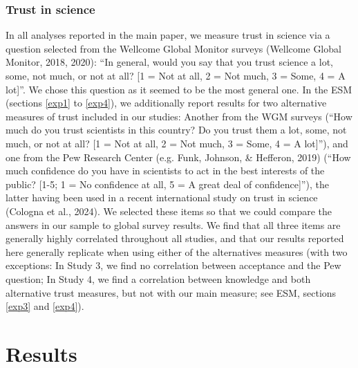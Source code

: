 \documentclass[
  doc,floatsintext]{apa6}
\begin{document}
\subsubsection{Trust in science}\label{trust-in-science}

In all analyses reported in the main paper, we measure trust in science via a question selected from the Wellcome Global Monitor surveys (Wellcome Global Monitor, 2018, 2020): ``In general, would you say that you trust science a lot, some, not much, or not at all? {[}1 = Not at all, 2 = Not much, 3 = Some, 4 = A lot{]}''. We chose this question as it seemed to be the most general one. In the ESM (sections \ref{exp1} to \ref{exp4}), we additionally report results for two alternative measures of trust included in our studies: Another from the WGM surveys (``How much do you trust scientists in this country? Do you trust them a lot, some, not much, or not at all? {[}1 = Not at all, 2 = Not much, 3 = Some, 4 = A lot{]}''), and one from the Pew Research Center (e.g. Funk, Johnson, \& Hefferon, 2019) (``How much confidence do you have in scientists to act in the best interests of the public? {[}1-5; 1 = No confidence at all, 5 = A great deal of confidence{]}''), the latter having been used in a recent international study on trust in science (Cologna et al., 2024). We selected these items so that we could compare the answers in our sample to global survey results. We find that all three items are generally highly correlated throughout all studies, and that our results reported here generally replicate when using either of the alternatives measures (with two exceptions: In Study 3, we find no correlation between acceptance and the Pew question; In Study 4, we find a correlation between knowledge and both alternative trust measures, but not with our main measure; see ESM, sections \ref{exp3} and \ref{exp4}).

\section{Results}\label{results}
\end{document}
